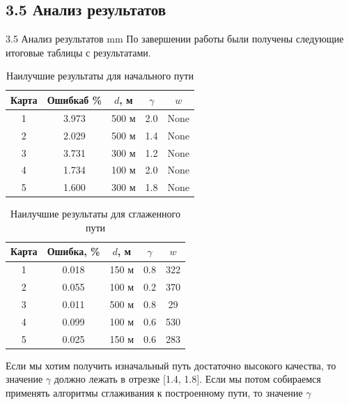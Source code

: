 \subsection*{\Large{3.5 Анализ результатов}}
 {3.5 Анализ результатов}
 mm
По завершении работы были получены следующие итоговые таблицы с результатами.
\begin{table}[H]
	\centering
	\caption{Наилучшие результаты для начального пути}
	\label{tabular:best_results_1}
	\begin{tabular}{|c|c|c|c|c|}
		\hline
		\textbf{Карта}     & \textbf{Ошибкаб \%} & \textbf{$d$, м} & \textbf{$\gamma$} & \textbf{$w$}   \\ \hline
		1 &    3.973  &  500 м & 2.0 & None  \\ \hline
		2 &  2.029 & 500 м & 1.4 & None \\ \hline
		3 &  3.731 & 300 м & 1.2 & None \\ \hline
		4 & 1.734 & 100 м & 2.0 & None \\ \hline
		5 & 1.600 & 300 м  & 1.8 & None \\ \hline
	\end{tabular}
	
\end{table}
\vspace{2mm}
\par
\begin{table}[H]
	\centering
	\caption{Наилучшие результаты для сглаженного пути}
	\label{tabular:best_results_2}
	\begin{tabular}{|c|c|c|c|c|}
		\hline
		\textbf{Карта}     & \textbf{Ошибка, \%}  & \textbf{$d$, м} & \textbf{$\gamma$} & \textbf{$w$}   \\ \hline
		1 & 0.018 & 150 м & 0.8 & 322 \\ \hline
		2 & 0.055 & 100 м & 0.2 & 370 \\ \hline
		3 & 0.011 & 500 м & 0.8 & 29 \\ \hline
		4 & 0.099 & 100 м & 0.6 & 530 \\ \hline
		5 & 0.025 & 150 м & 0.6 & 283 \\ \hline
	\end{tabular}
\end{table}
\vspace{2mm}
\par
Если мы хотим получить изначальный путь достаточно высокого
качества, то значение $\gamma$ должно лежать в отрезке [1.4, 1.8]. Если мы потом собираемся
применять алгоритмы сглаживания к построенному пути, то значение $\gamma$

